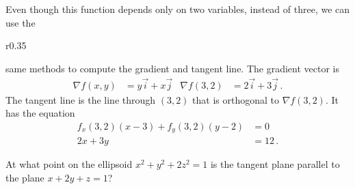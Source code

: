 \begin{solution} Even though this function depends only on two variables, instead of three, we can use the
\begin{wrapfigure}{r}{0.35\textwidth}
    \centering
{}
\end{wrapfigure}
same methods to compute the gradient and tangent line. The gradient vector is
\begin{align*}
\nabla f(x,y) &= y\vec i + x \vec j &
\nabla f(3,2) &= 2\vec i + 3 \vec j\,.
\end{align*}
The tangent line is the line through $(3,2)$ that is orthogonal to $\nabla f(3,2)$. It has the equation
\begin{align*}
f_x(3,2)(x-3) + f_y(3,2)(y-2) &= 0 \\
2x + 3y &= 12\,.
\end{align*}
\end{solution}

\begin{question}
At what point on the ellipsoid $x^2 + y^2 + 2z^2 = 1$ is the tangent plane parallel to the plane $x+2y+z=1$?
\end{question}

